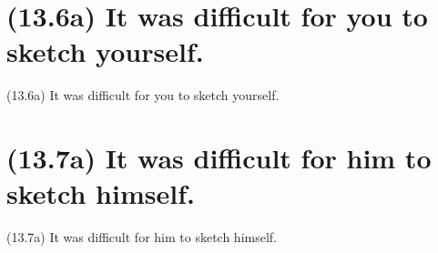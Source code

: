 \documentclass{article}
\begin{document}
\clearpage

%
%

\section*{(13.6a) It was difficult for you to sketch yourself.}

\bigbreak
\begin{enumerate*}
\item[(13.6a)] It was difficult for you to sketch yourself.
\end{enumerate*}
\bigbreak

\bigbreak
\begin{minipage}{\textwidth}
\end{minipage}
\bigbreak

\clearpage

%
%

\section*{(13.7a) It was difficult for him to sketch himself.}

\bigbreak
\begin{enumerate*}
\item[(13.7a)] It was difficult for him to sketch himself.
\end{enumerate*}
\bigbreak
\end{document}
